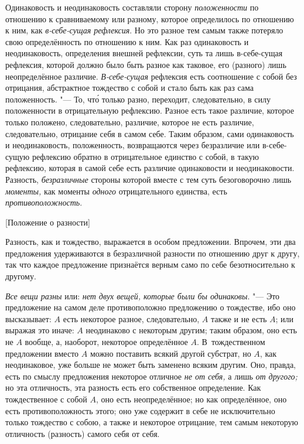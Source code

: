 Одинаковость и неодинаковость составляли сторону
{\em положенности} по отношению к сравниваемому или
разному, которое определилось по отношению к ним, как
{\em в-себе-сущая рефлексия}. Но это разное тем самым
также потеряло свою определённость по отношению к ним. Как раз одинаковость
и неодинаковость, определения внешней рефлексии, суть та лишь в-себе-сущая
рефлексия, которой должно было быть разное как таковое, его (разного) лишь
неопределённое различие. {\em В-себе-сущая} рефлексия
есть соотношение с собой без отрицания, абстрактное тождество с собой и
стало быть как раз сама положенность. "--- То, чт\'{о} только разно, переходит,
следовательно, в силу положенности в отрицательную рефлексию. Разное есть
такое различие, которое только положено, следовательно, различие, которое
не есть различие, следовательно, отрицание себя в самом себе. Таким
образом, сами одинаковость и неодинаковость, положенность, возвращаются
через безразличие или в-себе-сущую рефлексию обратно в отрицательное
единство с собой, в такую рефлексию, которая в самой себе есть различие
одинаковости и неодинаковости. Разность,
{\em безразличные} стороны которой вместе с тем суть
безоговорочно лишь {\em моменты,} как моменты
{\em одного} отрицательного единства, есть {\em противоположность}.

%
  {[Положение о разности]}

Разность, как и тождество, выражается в особом предложении. Впрочем, эти два
предложения удерживаются в безразличной разности по отношению друг к другу,
так что каждое предложение признаётся верным само по себе безотносительно к
другому.

{\em Все вещи разны} или: {\em нет
двух вещей, которые были бы одинаковы}. "--- Это предложение на самом деле
противоположно предложению о тождестве, ибо оно высказывает: $A$
есть некоторое разное, следовательно, $A$ также и не есть
$A$; или выражая это иначе: $A$ неодинаково с некоторым
другим; таким образом, оно есть не $A$ вообще, а, наоборот,
некоторое определённое $A$. В~тождественном предложении вместо
$A$ можно поставить всякий другой субстрат, но $A$, как
неодинаковое, уже больше не может быть заменено всяким другим. Оно, правда,
есть по смыслу предложения некоторое отличное {\em не от себя,}
а лишь {\em от другого;} но эта отличность,
эта разность есть его собственное определение. Как тождественное с собой
$A$, оно есть неопределённое; но как определённое, оно есть
противоположность этого; оно уже содержит в себе не исключительно только
тождество с собою, а также и некоторое отрицание, тем самым некоторую
отличность (разность) самого себя от себя.

